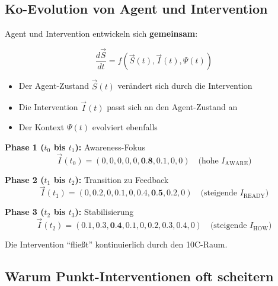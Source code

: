 \subsection{Ko-Evolution von Agent und Intervention}
\label{sec:17-coevolution}

Agent und Intervention entwickeln sich \textbf{gemeinsam}:

\begin{equation}
\frac{d\vec{S}}{dt} = f(\vec{S}(t), \vec{I}(t), \Psi(t))
\label{eq:17-coevolution}
\end{equation}

\begin{itemize}[nosep]
\item Der Agent-Zustand $\vec{S}(t)$ ver\"{a}ndert sich durch die Intervention
\item Die Intervention $\vec{I}(t)$ passt sich an den Agent-Zustand an
\item Der Kontext $\Psi(t)$ evolviert ebenfalls
\end{itemize}

\begin{tcolorbox}[colback=yellow!5!white, colframe=yellow!75!black,
    title=Beispiel: Diabetes-Pr\"{a}vention als Trajektorie]

\textbf{Phase 1 ($t_0$ bis $t_1$):} Awareness-Fokus
\begin{equation}
\vec{I}(t_0) = (0, 0, 0, 0, 0, \textbf{0.8}, 0.1, 0, 0) \quad \text{(hohe } I_{\text{AWARE}}\text{)}
\end{equation}

\textbf{Phase 2 ($t_1$ bis $t_2$):} Transition zu Feedback
\begin{equation}
\vec{I}(t_1) = (0, 0.2, 0, 0.1, 0, 0.4, \textbf{0.5}, 0.2, 0) \quad \text{(steigende } I_{\text{READY}}\text{)}
\end{equation}

\textbf{Phase 3 ($t_2$ bis $t_3$):} Stabilisierung
\begin{equation}
\vec{I}(t_2) = (0.1, 0.3, \textbf{0.4}, 0.1, 0, 0.2, 0.3, 0.4, 0) \quad \text{(steigende } I_{\text{HOW}}\text{)}
\end{equation}

Die Intervention ``flie\ss{}t'' kontinuierlich durch den 10C-Raum.

\end{tcolorbox}

\subsection{Warum Punkt-Interventionen oft scheitern}
\label{sec:17-point-failure}

